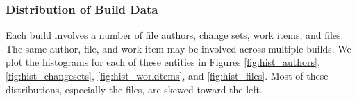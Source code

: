 \subsubsection{Distribution of Build Data}


Each build involves a number of file authors, change sets, work items, and files. The same author, file, and work item may be involved across multiple builds.
We plot the histograms for each of these entities in Figures \ref{fig:hist_authors}, \ref{fig:hist_changesets}, \ref{fig:hist_workitems}, and \ref{fig:hist_files}.
Most of these distributions, especially the files, are skewed toward the left. 


